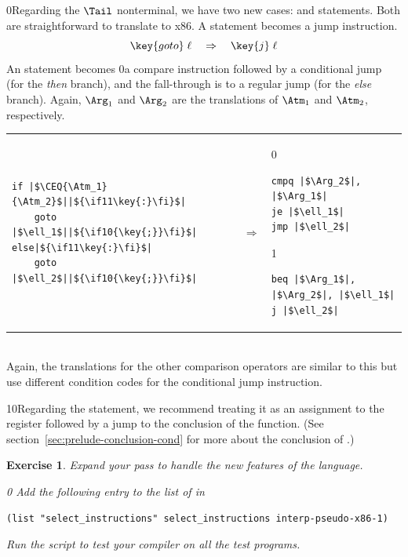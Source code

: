 \documentclass[7x10]{TimesAPriori_MIT}%
\def\racketEd{0}
\def\pythonEd{1}
\def\edition{1}
\def\xeightysixEd{0}
\def\riscvEd{1}
\def\architecture{1}
\newcommand\ifriscv[1]{\if\architecture\riscvEd{#1}\fi}
\newcommand\ifxeightsix[1]{\if\architecture\xeightysixEd{#1}\fi}
\newcommand{\racket}[1]{{\if\edition\racketEd{#1}\fi}}
\newcommand{\pythonColor}[0]{}
\newcommand{\python}[1]{{\if\edition\pythonEd\pythonColor #1\fi}}
\newtheorem{exercise}[theorem]{Exercise}
\numberwithin{theorem}{chapter}
\numberwithin{definition}{chapter}
\numberwithin{equation}{chapter}
\begin{document}
\racket{Regarding the $\Tail$ nonterminal, we have two new cases:
  \key{goto} and \key{if} statements. Both are straightforward to
  translate to x86.}
%
A  statement becomes a jump instruction.
\[
  \key{goto}\; \ell\racket{\key{;}} \quad \Rightarrow \quad
  \ifxeightsix{\key{jmp}\;\ell}
  \ifriscv{\key{j}\;\ell}
\]
%
An  statement becomes \ifxeightsix{a compare instruction followed by} a
conditional jump (for the \emph{then} branch), and the fall-through is to
a regular jump (for the \emph{else} branch). Again, $\Arg_1$ and $\Arg_2$
are the translations of $\Atm_1$ and $\Atm_2$, respectively.\\
\begin{tabular}{lll}
\begin{minipage}{0.4\textwidth}
\begin{lstlisting}
if |$\CEQ{\Atm_1}{\Atm_2}$||$\python{\key{:}}$|
    goto |$\ell_1$||$\racket{\key{;}}$|
else|$\python{\key{:}}$|
    goto |$\ell_2$||$\racket{\key{;}}$|
\end{lstlisting}
\end{minipage}
&
$\Rightarrow$
&
\begin{minipage}{0.4\textwidth}
\if\architecture\xeightysixEd
\begin{lstlisting}
cmpq |$\Arg_2$|, |$\Arg_1$|
je |$\ell_1$|
jmp |$\ell_2$|
\end{lstlisting}
\fi
\if\architecture\riscvEd
\begin{lstlisting}
beq |$\Arg_1$|, |$\Arg_2$|, |$\ell_1$|
j |$\ell_2$|
\end{lstlisting}
\fi
\end{minipage}
\end{tabular}  \\
Again, the translations for the other comparison operators are similar to this
but use different condition codes for the conditional jump instruction.


\python{\ifxeightsix{Regarding the  statement, we recommend treating it
  as an assignment to the \RAX{} register followed by a jump to the
  conclusion of the \code{main} function. (See section~\ref{sec:prelude-conclusion-cond} for more about the conclusion of \code{main}.)}}

\begin{exercise}\normalfont\normalsize
Expand your  pass to handle the new
features of the \LangCIf{} language.
%
{\if\edition\racketEd
Add the following entry to the list of  in
\begin{lstlisting}
(list "select_instructions" select_instructions interp-pseudo-x86-1)
\end{lstlisting}
\fi}
%
Run the script to test your compiler on all the test programs.
\end{exercise}
\end{document}
